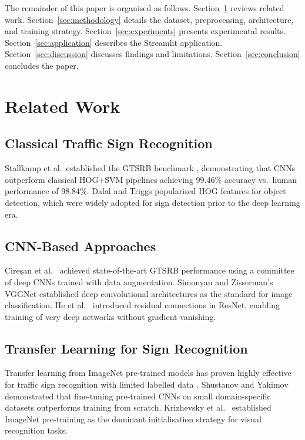 \documentclass[journal,10pt,twocolumn]{IEEEtran}
\begin{document}
The remainder of this paper is organised as follows. Section~\ref{sec:related}
reviews related work. Section~\ref{sec:methodology} details the dataset,
preprocessing, architecture, and training strategy.
Section~\ref{sec:experiments} presents experimental results.
Section~\ref{sec:application} describes the Streamlit application.
Section~\ref{sec:discussion} discusses findings and limitations.
Section~\ref{sec:conclusion} concludes the paper.

\section{Related Work}
\label{sec:related}

\subsection{Classical Traffic Sign Recognition}

Stallkamp et al.\ established the GTSRB benchmark \cite{stallkamp2012man},
demonstrating that CNNs outperform classical HOG+SVM pipelines achieving
99.46\% accuracy vs.\ human performance of 98.84\%. Dalal and Triggs
\cite{dalal2005histograms} popularised HOG features for object detection,
which were widely adopted for sign detection prior to the deep learning era.

\subsection{CNN-Based Approaches}

Cireşan et al.\ \cite{ciresan2011committee} achieved state-of-the-art GTSRB
performance using a committee of deep CNNs trained with data augmentation.
Simonyan and Zisserman's VGGNet \cite{simonyan2014very} established deep
convolutional architectures as the standard for image classification.
He et al.\ \cite{he2016deep} introduced residual connections in ResNet,
enabling training of very deep networks without gradient vanishing.

\subsection{Transfer Learning for Sign Recognition}

Transfer learning from ImageNet pre-trained models has proven highly effective
for traffic sign recognition with limited labelled data \cite{pan2010survey}.
Shustanov and Yakimov \cite{shustanov2017cnn} demonstrated that fine-tuning
pre-trained CNNs on small domain-specific datasets outperforms training from
scratch. Krizhevsky et al.\ \cite{krizhevsky2012imagenet} established ImageNet
pre-training as the dominant initialisation strategy for visual recognition tasks.
\end{document}
